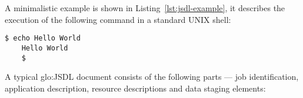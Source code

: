 A  minimalistic  example is  shown  in Listing~\ref{lst:jsdl-example},  it
describes the execution of the following command in a standard UNIX shell:

\begin{minipage}{0.75\textwidth}
  \begin{lstlisting}[language=ksh]
    $ echo Hello World
    Hello World
    $
  \end{lstlisting}
\end{minipage}



\bigskip

A typical \gls{glo:JSDL} document consists  of the following parts --- job
identification,  application description,  resource descriptions  and data
staging elements:

